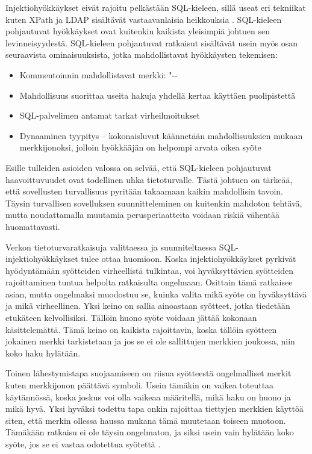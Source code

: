 Injektiohyökkäykset eivät rajoitu pelkästään SQL-kieleen, sillä useat eri tekniikat kuten XPath ja LDAP sisältävät vastaavanlaisia 
heikkouksia \cite{WEB2}. SQL-kieleen pohjautuvat hyökkäykset ovat kuitenkin kaikista yleisimpiä johtuen sen levinneisyydestä. SQL-kieleen
pohjautuvat ratkaisut sisältävät usein myös osan seuraavista ominaisuuksista, jotka mahdollistavat hyökkäysten tekemisen:

\begin{itemize}
\item Kommentoinnin mahdollistavat merkki: "{-}{-}
\item Mahdollisuus suorittaa useita hakuja yhdellä kertaa käyttäen puolipistettä
\item SQL-palvelimen antamat tarkat virheilmoitukset
\item Dynaaminen tyypitys -- kokonaisluvut käännetään mahdollisuuksien mukaan merkkijonoksi, jolloin hyökkääjän
             on helpompi arvata oikea syöte \cite{SQLSS}
\end{itemize}


Esille tulleiden asioiden valossa on selvää, että SQL-kieleen pohjautuvat haavoittuvuudet ovat todellinen uhka tietoturvalle.
Tästä johtuen on tärkeää, että sovellusten turvallisuus pyritään takaamaan kaikin mahdollisin tavoin. Täysin turvallisen sovelluksen 
suunnitteleminen on kuitenkin mahdoton tehtävä, mutta noudattamalla muutamia perusperiaatteita voidaan riskiä vähentää huomattavasti.

Verkon tietoturvaratkaisuja valittaessa ja suunniteltaessa
SQL-injektiohyökkäykset tulee ottaa huomioon.
Koska injektiohyökkäykset pyrkivät hyödyntämään syötteiden
virheellistä tulkintaa, voi hyväksyttävien syötteiden rajoittaminen
tuntua helpolta ratkaisulta ongelmaan. Osittain tämä ratkaisee asian,
mutta ongelmaksi muodostuu se, kuinka valita mikä syöte on
hyväksyttävä ja mikä virheellinen. Yksi keino on sallia ainoastaan
syötteet, jotka tiedetään etukäteen kelvollisiksi. Tällöin huono syöte
voidaan jättää kokonaan käsittelemättä. Tämä keino on kaikista
rajoittavin, koska tällöin syötteen jokainen merkki tarkistetaan ja
jos se ei ole sallittujen merkkien joukossa, niin koko haku
hylätään.

Toinen lähestymistapa suojaamiseen on riisua syötteestä ongelmalliset
merkit kuten merkkijonon päättävä symboli. Usein tämäkin on vaikea
toteuttaa käytännössä, koska joskus voi olla vaikeaa määritellä, mikä
haku on huono ja mikä hyvä. Yksi hyväksi todettu tapa onkin rajoittaa
tiettyjen merkkien käyttöä siten, että merkin ollessa haussa mukana
tämä muutetaan toiseen muotoon. Tämäkään ratkaisu ei ole täysin
ongelmaton, ja siksi usein vain hylätään koko syöte, jos se ei vastaa
odotettua syötettä \cite{SQLSS}.


